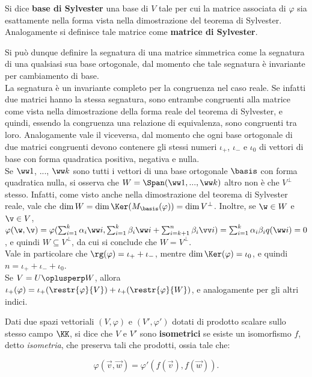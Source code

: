 \documentclass[11pt]{article}
\begin{document}
	\begin{definition}
		Si dice \textbf{base di Sylvester} una base di $V$ tale per cui la
		matrice associata di $\varphi$ sia esattamente nella forma
		vista nella dimostrazione del teorema di Sylvester. Analogamente
		si definisce tale matrice come \textbf{matrice di Sylvester}.
	\end{definition}

	\begin{remark} \nl
		\li Si può dunque definire la segnatura di una matrice simmetrica
		come la segnatura di una qualsiasi sua base ortogonale, dal
		momento che tale segnatura è invariante per cambiamento di base. \\
		\li La segnatura è un invariante completo per la congruenza nel caso reale. Se infatti due matrici hanno la stessa segnatura, sono
		entrambe congruenti alla matrice come vista nella dimostrazione
		della forma reale del teorema di Sylvester, e quindi, essendo
		la congruenza una relazione di equivalenza, sono congruenti
		tra loro. Analogamente vale il viceversa, dal momento che ogni
		base ortogonale di due matrici congruenti devono contenere gli
		stessi numeri $\iota_+$, $\iota_-$ e $\iota_0$ di vettori
		di base con forma quadratica positiva, negativa e nulla. \\
		\li Se $\ww 1$, ..., $\ww k$ sono tutti i vettori di una base
		ortogonale $\basis$ con forma quadratica nulla, si osserva che $W = \Span(\ww 1, ..., \ww k)$ altro non è che $V^\perp$ stesso. Infatti, come
		visto anche nella dimostrazione del teorema di Sylvester reale, vale
		che	$\dim W = \dim \Ker (M_\basis(\varphi)) = \dim V^\perp$. Inoltre,
		se $\w \in W$ e $\v \in V$, $\varphi(\w, \v) = \varphi(\sum_{i=1}^k
		\alpha_i \ww i, \sum_{i=1}^k \beta_i \ww i + \sum_{i=k+1}^n \beta_i \vv i)
		= \sum_{i=1}^k \alpha_i \beta_i q(\ww i) = 0$, e quindi
		$W \subseteq V^\perp$, da cui si conclude che $W = V^\perp$. \\
		\li Vale in particolare che $\rg(\varphi) = \iota_+ + \iota_-$, mentre
		$\dim \Ker(\varphi) = \iota_0$, e quindi $n = \iota_+ + \iota_- + \iota_0$. \\
		\li Se $V = U \oplusperp W$, allora $\iota_+(\varphi) = \iota_+(\restr{\varphi}{V}) + \iota_+(\restr{\varphi}{W})$, e
			analogamente per gli altri indici.
	\end{remark}

	\begin{definition}
		Dati due spazi vettoriali $(V, \varphi)$ e
		$(V', \varphi')$ dotati di prodotto scalare sullo stesso campo $\KK$, si dice che
		$V$ e $V'$ sono \textbf{isometrici} se esiste un isomorfismo
		$f$, detto \textit{isometria}, che preserva tali che prodotti, ossia tale che:
		
		\[ \varphi(\vec v, \vec w) = \varphi'(f(\vec v), f(\vec w)). \]
	\end{definition}
\end{document}
